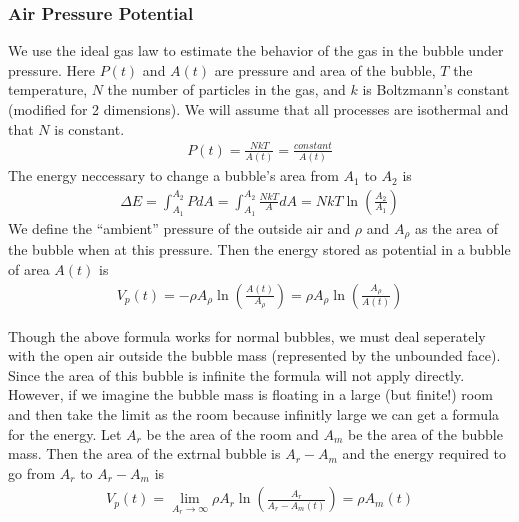 \documentclass{article}
\begin{document}
\subsubsection{Air Pressure Potential}
We use the ideal gas law to estimate the
behavior of the gas in the bubble under pressure. Here $P(t)$ and $A(t)$ are
pressure and area of the bubble, $T$ the temperature, $N$ the number of particles in the
gas, and $k$ is Boltzmann's constant (modified for 2 dimensions). We will assume
that all processes are isothermal and that $N$ is constant.
\begin{align*}
P(t)=\frac{NkT}{A(t)}=\frac{constant}{A(t)}
\end{align*}
The energy neccessary to change a bubble's area from $A_1$ to $A_2$ is
\begin{align*}
\Delta E = \int_{A_1}^{A_2} P dA = \int_{A_1}^{A_2} \frac{NkT}{A} dA = NkT
\ln\left(\frac{A_2}{A_1}\right)
\end{align*}
We define the ``ambient'' pressure of the outside air and $\rho$ and $A_\rho$ as
the area of the bubble when at this pressure. Then the energy stored as
potential in a bubble of area $A(t)$ is
\begin{align*}
V_p(t) = -\rho A_\rho \ln\left(\frac{A(t)}{A_\rho}\right) = \rho A_\rho
\ln\left(\frac{A_\rho}{A(t)}\right)
\end{align*}

Though the above formula works for normal bubbles, we must deal seperately with
the open air outside the bubble mass (represented by the unbounded face). Since
the area of this bubble is infinite the formula will not apply directly.
However, if we imagine the bubble mass is floating in a large (but finite!) room
and then take the limit as the room because infinitly large we can get a formula
for the energy. Let $A_r$ be the area of the room and $A_m$ be the area of the
bubble mass. Then the area of the extrnal bubble is $A_r-A_m$ and the energy
required to go from $A_r$ to $A_r-A_m$ is
\begin{align*}
V_p(t) = \lim_{A_r\to\infty} \rho A_r \ln\left(\frac{A_r}{A_r-A_m(t)}\right)=
\rho A_m(t)
\end{align*}
\end{document}
